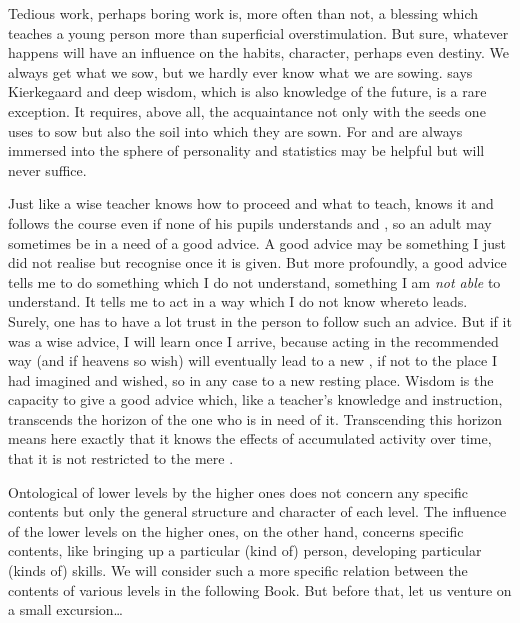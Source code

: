 Tedious work, perhaps boring work is, more often than not, a blessing which
teaches a young person more than superficial overstimulation.  But sure,
whatever happens will have an influence on the habits, character, perhaps even
destiny.  We always get what we sow, but we hardly ever know what we are sowing.
 says Kierkegaard and deep wisdom,
which is also knowledge of the future, is a rare exception.  It requires, above
all, the acquaintance not only with the seeds one uses to sow but also the soil
into which they are sown.  For  and  are always
immersed into the  sphere of  personality and 
statistics may be helpful but will never suffice.


Just like a wise teacher knows how to proceed and what to teach, knows it and
follows the course even if none of his pupils understands  and
, so an adult may sometimes be in a need of a good advice.  A good
advice may be something I just did not realise but recognise once it is given.
But more profoundly, a good advice tells me to do something which I do not
understand, something I am {\em not able} to understand.  It tells me to act in
a way which I do not know whereto leads.  Surely, one has to have a lot trust in
the person to follow such an advice.  But if it was a wise advice, I will learn
once I arrive, because acting in the recommended way (and if heavens so wish)
will eventually lead to a new , if not to the place I had imagined and
wished, so in any case to a new resting place. Wisdom is the capacity to give a
good advice which, like a teacher's knowledge and instruction, transcends the
horizon of the one who is in need of it. Transcending this horizon means here
exactly that it knows the effects of accumulated activity over time, that it is
not restricted to the mere .

Ontological  of lower levels by the higher ones does not concern
any specific contents but only the general structure and character of each
level. The influence of the lower levels on the higher ones, on the other hand,
concerns specific contents, like bringing up a particular (kind of) person,
developing particular (kinds of) skills. We will consider such a more specific
relation between the contents of various levels in the following Book. But
before that, let us venture on a small excursion\ldots


